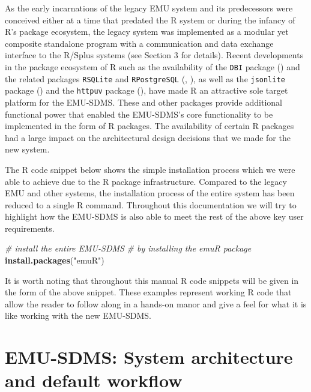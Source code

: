 \documentclass[]{book}
\newenvironment{Shaded}{\begin{snugshade}}{\end{snugshade}}
\newcommand{\CommentTok}[1]{\textcolor[rgb]{0.56,0.35,0.01}{\textit{#1}}}
\newcommand{\KeywordTok}[1]{\textcolor[rgb]{0.13,0.29,0.53}{\textbf{#1}}}
\newcommand{\NormalTok}[1]{#1}
\newcommand{\StringTok}[1]{\textcolor[rgb]{0.31,0.60,0.02}{#1}}
\theoremstyle{definition}
\theoremstyle{definition}
\theoremstyle{definition}
\theoremstyle{remark}
\begin{document}
As the early incarnations of the legacy EMU system and its predecessors
were conceived either at a time that predated the R system or during the
infancy of R's package ecosystem, the legacy system was implemented as a
modular yet composite standalone program with a communication and data
exchange interface to the R/Splus systems (see \citet{cassidy:sc2001a}
Section 3 for details). Recent developments in the package ecosystem of
R such as the availability of the \texttt{DBI} package
(\citet{r-special-interest-group-on-databases-r-sig-db:2016a}) and the
related packages \texttt{RSQLite} and \texttt{RPostgreSQL}
(\citet{wickham:2014a}, \citet{conway:2016a}), as well as the
\texttt{jsonlite} package (\citet{ooms:as2014a}) and the \texttt{httpuv}
package (\citet{rstudio:2015a}), have made R an attractive sole target
platform for the EMU-SDMS. These and other packages provide additional
functional power that enabled the EMU-SDMS's core functionality to be
implemented in the form of R packages. The availability of certain R
packages had a large impact on the architectural design decisions that
we made for the new system.

The R code snippet below shows the simple installation process which we
were able to achieve due to the R package infrastructure. Compared to
the legacy EMU and other systems, the installation process of the entire
system has been reduced to a single R command. Throughout this
documentation we will try to highlight how the EMU-SDMS is also able to
meet the rest of the above key user requirements.

\begin{Shaded}
\begin{Highlighting}[]
\CommentTok{# install the entire EMU-SDMS}
\CommentTok{# by installing the emuR package}
\KeywordTok{install.packages}\NormalTok{(}\StringTok{"emuR"}\NormalTok{)}
\end{Highlighting}
\end{Shaded}

It is worth noting that throughout this manual R code snippets will be
given in the form of the above snippet. These examples represent working
R code that allow the reader to follow along in a hands-on manor and
give a feel for what it is like working with the new EMU-SDMS.

\hypertarget{sec:overview-sysArch}{%
\section{EMU-SDMS: System architecture and default
workflow}\label{sec:overview-sysArch}}
\end{document}
